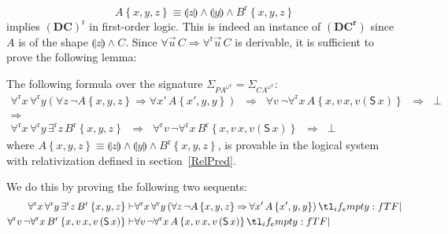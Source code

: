 \documentclass{CSML}
\newcommand*\ifpresent[3]{\tl_if_empty:fTF{#1}{#3}{#2}}
\newcommand*\Entails{\mathrel{\vdash}}
\newcommand*\BarSep{\mathrel{|}}
\newcommand*\Sequent[3]{#1\Entails#2\ifpresent{#3}{\BarSep}{}#3}
\newcommand*\LogVarA{x}
\newcommand*\LogVarB{y}
\newcommand*\LogVarC{z}
\newcommand*\LogVarD{u}
\newcommand*\LogVarE{v}
\newcommand*\LogConst[1]{\mathsf{#1}}
\newcommand*\LogImp{\mathbin{\Rightarrow}}
\newcommand*\LogAnd{\mathbin{\wedge}}
\newcommand*\LogBot\bot
\newcommand*\LogRel[1]{\llparenthesis#1\rrparenthesis}
\newcommand*\LogRelForm[1]{{#1^\mathrm{r}}}
\newcommand*\LogForallRel{\forall^\mathrm{r}}
\newcommand*\LogExistsRel{\exists^\mathrm{r}}
\newcommand*\LogFormA{A}
\newcommand*\LogFormB{B}
\newcommand*\LogFormC{C}
\newcommand*\LogSubst[1]{\left\{#1\right\}}
\newcommand*\PA{{P\!A}}
\newcommand*\PAom{{\PA^\omega}}
\newcommand*\CA{{C\!A}}
\newcommand*\CAom{{\CA^\omega}}
\newcommand*\CALogS{\LogConst{S}}
\newcommand*\CAAxName[1]{{\bm{\scriptstyle(#1)}}}
\newcommand*\CADCUnrelName{\CAAxName{DC}}
\newcommand*\CADCName{\CAAxName{DC^r}}
\begin{document}
$$\LogFormA\LogSubst{\LogVarA,\LogVarB,\LogVarC}\equiv\LogRel{\LogVarC}\LogAnd\LogRel{\LogVarB}\LogAnd\LogRelForm{\LogFormB}\LogSubst{\LogVarA,\LogVarB,\LogVarC}$$
implies $\LogRelForm{\CADCUnrelName}$ in first-order logic. This is indeed an instance of $\CADCName$ since $\LogFormA$ is of the shape $\LogRel{\LogVarC}\LogAnd\LogFormC$. Since $\forall\vec{\LogVarD}\,\LogFormC\LogImp\LogForallRel\vec{\LogVarD}\,\LogFormC$ is derivable, it is sufficient to prove the following lemma:
\begin{lem}
The following formula over the signature $\Sigma_\LogRelForm{\PAom}=\Sigma_\LogRelForm{\CAom}$:
\begin{multline*}
\LogForallRel\LogVarA\,\LogForallRel\LogVarB\left(\forall\LogVarC\,\neg\LogFormA\LogSubst{\LogVarA,\LogVarB,\LogVarC}\LogImp\forall\LogVarA'\,\LogFormA\LogSubst{\LogVarA',\LogVarB,\LogVarB}\right)\;\;\LogImp\;\;\forall\LogVarE\,\neg\LogForallRel\LogVarA\,\LogFormA\LogSubst{\LogVarA,\LogVarE\,\LogVarA,\LogVarE\left(\CALogS\,\LogVarA\right)}\;\;\LogImp\;\;\LogBot\\
\LogImp\\
\LogForallRel\LogVarA\,\LogForallRel\LogVarB\,\LogExistsRel\LogVarC\,\LogRelForm{\LogFormB}\LogSubst{\LogVarA,\LogVarB,\LogVarC}\;\;\LogImp\;\;\LogForallRel\LogVarE\,\neg\LogForallRel\LogVarA\,\LogRelForm{\LogFormB}\LogSubst{\LogVarA,\LogVarE\,\LogVarA,\LogVarE\left(\CALogS\,\LogVarA\right)}\;\;\LogImp\;\;\LogBot
\end{multline*}
where $\LogFormA\LogSubst{\LogVarA,\LogVarB,\LogVarC}\equiv\LogRel{\LogVarC}\LogAnd\LogRel{\LogVarB}\LogAnd\LogRelForm{\LogFormB}\LogSubst{\LogVarA,\LogVarB,\LogVarC}$, is provable in the logical system with relativization defined in section~\ref{RelPred}.
\end{lem}
\proof
We do this by proving the following two sequents:
\begin{align*}
\Sequent{\LogForallRel\LogVarA\,\LogForallRel\LogVarB\,\LogExistsRel\LogVarC\,\LogRelForm{\LogFormB}\LogSubst{\LogVarA,\LogVarB,\LogVarC}}{&\LogForallRel\LogVarA\,\LogForallRel\LogVarB\left(\forall\LogVarC\,\neg\LogFormA\LogSubst{\LogVarA,\LogVarB,\LogVarC}\LogImp\forall\LogVarA'\,\LogFormA\LogSubst{\LogVarA',\LogVarB,\LogVarB}\right)}{}\\
\Sequent{\LogForallRel\LogVarE\,\neg\LogForallRel\LogVarA\,\LogRelForm{\LogFormB}\LogSubst{\LogVarA,\LogVarE\,\LogVarA,\LogVarE\left(\CALogS\,\LogVarA\right)}}{&\forall\LogVarE\,\neg\LogForallRel\LogVarA\,\LogFormA\LogSubst{\LogVarA,\LogVarE\,\LogVarA,\LogVarE\left(\CALogS\,\LogVarA\right)}}{}
\end{align*}
\end{document}
